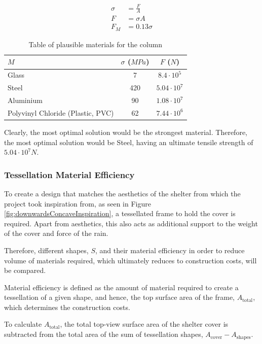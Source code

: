 \documentclass[a4paper,titlepage]{article}
\begin{document}
\begin{align}
    \sigma&=\frac{F}A\\
    F&=\sigma A\\
    F_M&=0.13\sigma
\end{align}

\begin{table}[htbp]
    \centering
    \begin{tabular}{l|c|c}
        $M$ & $\sigma$ ($\si{MPa}$) & $F$ ($\si{N}$) \\
        \hline
        Glass & 7 & $8.4\cdot10^5$ \\
        Steel & 420 & $5.04\cdot10^7$ \\
        Aluminium & 90 & $1.08\cdot10^7$ \\
        Polyvinyl Chloride (Plastic, PVC) & 62 & $7.44\cdot10^6$ \\
    \end{tabular}
    \caption{Table of plausible materials for the column}
    \label{tab:columnMaterial}
\end{table}

Clearly, the most optimal solution would be the strongest material. Therefore, the most optimal solution would be Steel, having an ultimate tensile strength of $5.04\cdot10^7\si{N}$.

\subsubsection{Tessellation Material Efficiency}

To create a design that matches the aesthetics of the shelter from which the project took inspiration from, as seen in Figure \ref{fig:downwardsConcaveInspiration}, a tessellated frame to hold the cover is required. Apart from aesthetics, this also acts as additional support to the weight of the cover and force of the rain.

Therefore, different shapes, $S$, and their material efficiency in order to reduce volume of materials required, which ultimately reduces to construction costs, will be compared.

Material efficiency is defined as the amount of material required to create a tessellation of a given shape, and hence, the top surface area of the frame, $A_\text{total}$, which determines the construction costs.

To calculate $A_\text{total}$, the total top-view surface area of the shelter cover is subtracted from the total area of the sum of tessellation shapes, $A_\text{cover}-A_\text{shapes}$.
\end{document}
